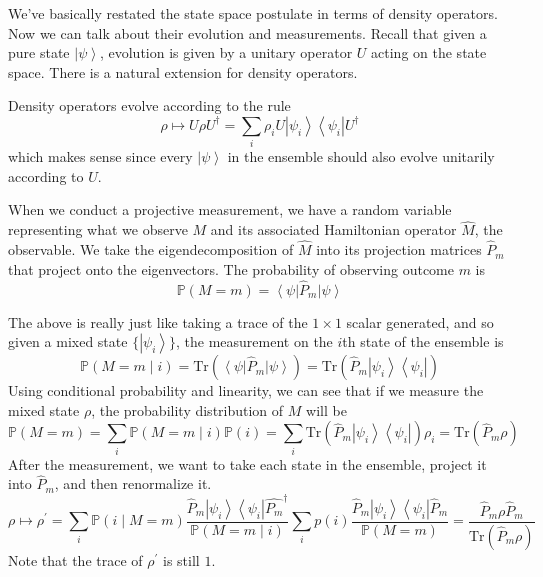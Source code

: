 \documentclass{article}
\newcommand{\ket}[1]{\ensuremath{\left|#1\right\rangle}}
\newcommand{\bra}[1]{\ensuremath{\left\langle#1\right|}}
\begin{document}
  We've basically restated the state space postulate in terms of density operators. Now we can talk about their evolution and measurements. Recall that given a pure state $\ket{\psi}$, evolution is given by a unitary operator $U$ acting on the state space. There is a natural extension for density operators. 

  \begin{lemma}
    Density operators evolve according to the rule 
    \begin{equation} 
      \rho \mapsto U \rho U^\dagger = \sum_i \rho_i U \ket{\psi_i} \bra{\psi_i} U^\dagger
    \end{equation}
    which makes sense since every $\ket{\psi}$ in the ensemble should also evolve unitarily according to $U$. 
  \end{lemma}

  When we conduct a projective measurement, we have a random variable representing what we observe $M$ and its associated Hamiltonian operator $\hat{M}$, the observable. We take the eigendecomposition of $\hat{M}$ into its projection matrices $\hat{P}_m$ that project onto the eigenvectors. The probability of observing outcome $m$ is 
  \begin{equation}
    \mathbb{P}(M = m) = \bra{\psi} \hat{P}_m \ket{\psi} 
  \end{equation}

  \begin{lemma}
    The above is really just like taking a trace of the $1 \times 1$ scalar generated, and so given a mixed state $\{ \ket{\psi_i}\}$, the measurement on the $i$th state of the ensemble is 
    \begin{equation}
      \mathbb{P}(M = m \mid i) = \mathrm{Tr}(\bra{\psi} \hat{P}_m \ket{\psi}) = \mathrm{Tr}( \hat{P}_m \ket{\psi_i} \bra{\psi_i}) 
    \end{equation}
    Using conditional probability and linearity, we can see that if we measure the mixed state $\rho$, the probability distribution of $M$ will be 
    \begin{equation}
      \mathbb{P}(M = m) = \sum_i \mathbb{P}(M = m \mid i) \mathbb{P}(i) = \sum_i \mathrm{Tr}(\hat{P}_m \ket{\psi_i} \bra{\psi_i}) \rho_i = \mathrm{Tr}(\hat{P}_m \rho) 
    \end{equation}
    After the measurement, we want to take each state in the ensemble, project it into $\hat{P}_m$, and then renormalize it. 
    \begin{equation}
      \rho \mapsto \rho^\prime = \sum_i \mathbb{P}(i \mid M = m) \frac{\hat{P}_m \ket{\psi_i} \bra{\psi_i} \hat{P_m}^\dagger}{\mathbb{P}(M = m \mid i)} \sum_i p(i) \frac{\hat{P}_m \ket{\psi_i} \bra{\psi_i} \hat{P}_m}{\mathbb{P}(M = m)} = \frac{\hat{P}_m \rho \hat{P}_m}{\mathrm{Tr}(\hat{P}_m \rho)} 
    \end{equation}
    Note that the trace of $\rho^\prime$ is still $1$. 
  \end{lemma}
\end{document}
